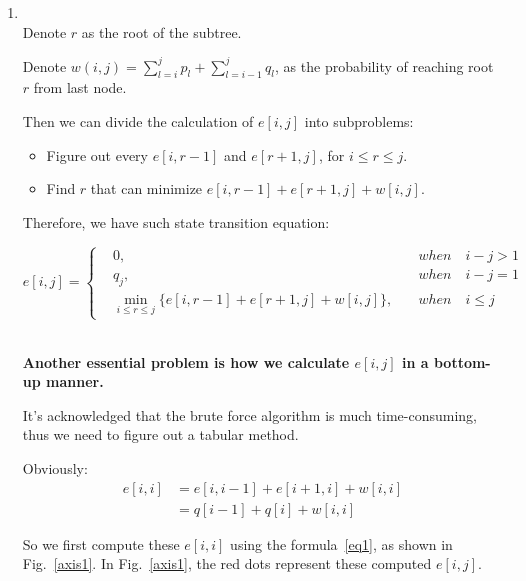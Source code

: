 \documentclass[12pt,a4paper]{article}
\makeatletter
\newtheorem*{solution}{Solution}
\theoremstyle{definition}
\renewenvironment{solution}[1][Solution] {\par\pushQED{\qed}\normalfont\topsep6\p@\@plus6\p@\relax\trivlist\item[\hskip\labelsep\bfseries#1\@addpunct{.}]\ignorespaces}{\popQED\endtrivlist\@endpefalse} \makeatother
\makeatother
\begin{document}
\begin{enumerate}
\begin{enumerate}
			\begin{solution}
			~\\
			Denote $r$ as the root of the subtree.
			
			Denote $w(i, j)=\sum_{l=i}^{j} p_{l}+\sum_{l=i-1}^{j} q_{l}$, as the probability of reaching root $r$ from last node. 
			
			Then we can divide the calculation of $e[i,j]$ into subproblems: \begin{itemize}
			    \item Figure out every $e[i,r-1]$ and $e[r+1, j]$, for $i\leq r \leq j$.
			    \item Find $r$ that can minimize $e[i,r-1] + e[r+1,j] + w[i,j]$.
			\end{itemize}
			
			Therefore, we have such state transition equation:
			
			$$ 
			e[i,j]=\left\{
            \begin{aligned}
            &0,\quad &when\quad i-j>1\\
            &q_j,\quad &when\quad i-j=1\\
            &\min_{i\leq r\leq j}\{ e[i,r-1] + e[r+1, j] + w[i,j]\},\quad &when\quad i\leq j
            \end{aligned}
            \right.
            $$
            
            ~\\
            
            
            \textbf{Another essential problem is how we calculate $e[i,j]$ in a bottom-up manner.} 
            
            It's acknowledged that the brute force algorithm is much time-consuming, thus we need to figure out a tabular method.
            
            Obviously:
                \begin{equation}
                \begin{split}
                \label{eq1}
                e[i,i] &= e[i,i-1] + e[i+1, i] + w[i,i]\\
                    &= q[i-1] + q[i] + w[i,i]
                 \end{split}       
                \end{equation}
                
            So we first compute these $e[i,i]$ using the formula~\ref{eq1}, as shown in Fig.~\ref{axis1}. In Fig.~\ref{axis1}, {\color{red} the red dots} represent these computed $e[i,j]$.
            ~\\
            

\end{solution}
\end{enumerate}
\end{enumerate}
\end{document}

